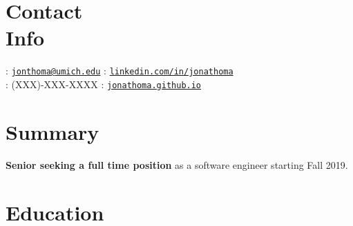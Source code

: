 \documentclass[margin,line]{resume}
\begin{document}
\begin{resume}
	\vspace{-3.5mm}
	\section{\mysidestyle Contact\\Info}
	\noindent \faEnvelope : \href{mailto:jonthoma@umich.edu}{\nolinkurl{jonthoma@umich.edu}} \hfill \faLinkedinSign : \href{https://linkedin.com/in/jonathoma}{\nolinkurl{linkedin.com/in/jonathoma}}\\
	\noindent \faPhone : (XXX)-XXX-XXXX \hfill \faUser : \href{https://jonathoma.github.io}{\nolinkurl{jonathoma.github.io}} \\ %
	\vspace{-2.5mm}
	    
	\sectionbreak
	\vspace{-3.5mm}
	\section{\mysidestyle Summary}
	\textbf{Senior seeking a full time position} as a software engineer starting Fall 2019. \vspace{-2.5mm}\\ 
	    
	\sectionbreak
	\vspace{-2.5mm}
	\section{\mysidestyle Education}
	

\end{resume}
\end{document}
